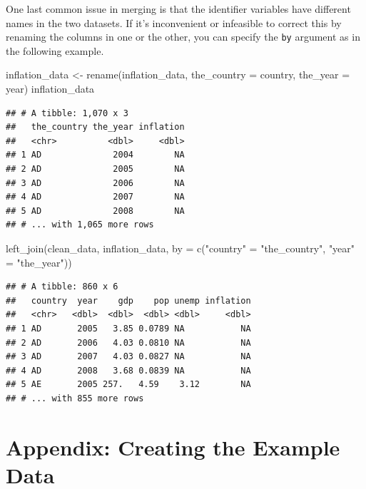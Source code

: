 \documentclass[
  12pt,
  oneside,openany]{book}
\newenvironment{Shaded}{\begin{snugshade}}{\end{snugshade}}
\newcommand{\AttributeTok}[1]{\textcolor[rgb]{0.77,0.63,0.00}{#1}}
\newcommand{\FunctionTok}[1]{\textcolor[rgb]{0.00,0.00,0.00}{#1}}
\newcommand{\NormalTok}[1]{#1}
\newcommand{\OtherTok}[1]{\textcolor[rgb]{0.56,0.35,0.01}{#1}}
\newcommand{\StringTok}[1]{\textcolor[rgb]{0.31,0.60,0.02}{#1}}
\begin{document}
One last common issue in merging is that the identifier variables have different names in the two datasets. If it's inconvenient or infeasible to correct this by renaming the columns in one or the other, you can specify the \texttt{by} argument as in the following example.

\begin{Shaded}
\begin{Highlighting}[]
\NormalTok{inflation\_data }\OtherTok{\textless{}{-}} \FunctionTok{rename}\NormalTok{(inflation\_data,}
                         \AttributeTok{the\_country =}\NormalTok{ country,}
                         \AttributeTok{the\_year =}\NormalTok{ year)}
\NormalTok{inflation\_data}
\end{Highlighting}
\end{Shaded}

\begin{verbatim}
## # A tibble: 1,070 x 3
##   the_country the_year inflation
##   <chr>          <dbl>     <dbl>
## 1 AD              2004        NA
## 2 AD              2005        NA
## 3 AD              2006        NA
## 4 AD              2007        NA
## 5 AD              2008        NA
## # ... with 1,065 more rows
\end{verbatim}

\begin{Shaded}
\begin{Highlighting}[]
\FunctionTok{left\_join}\NormalTok{(clean\_data,}
\NormalTok{          inflation\_data,}
          \AttributeTok{by =} \FunctionTok{c}\NormalTok{(}\StringTok{"country"} \OtherTok{=} \StringTok{"the\_country"}\NormalTok{, }\StringTok{"year"} \OtherTok{=} \StringTok{"the\_year"}\NormalTok{))}
\end{Highlighting}
\end{Shaded}

\begin{verbatim}
## # A tibble: 860 x 6
##   country  year    gdp    pop unemp inflation
##   <chr>   <dbl>  <dbl>  <dbl> <dbl>     <dbl>
## 1 AD       2005   3.85 0.0789 NA           NA
## 2 AD       2006   4.03 0.0810 NA           NA
## 3 AD       2007   4.03 0.0827 NA           NA
## 4 AD       2008   3.68 0.0839 NA           NA
## 5 AE       2005 257.   4.59    3.12        NA
## # ... with 855 more rows
\end{verbatim}

\hypertarget{appendix-creating-the-example-data}{%
\section{Appendix: Creating the Example Data}\label{appendix-creating-the-example-data}}
\end{document}

